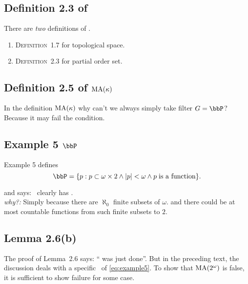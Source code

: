 \subsection{Definition 2.3 of \ccc}

There are \emph{two} definitions of \ccc.
\begin{enumerate}
\item \textsc{Definition}~1.7 for topological space.
\item \textsc{Definition}~2.3 for partial order  set.
\end{enumerate}

\subsection{Definition 2.5 of \(\mathop{\rm MA}\nolimits(\kappa)\)}

In the definition \(\mathop{\rm MA}\nolimits(\kappa)\)
why can't we always simply take filter \(G=\bbP\)?\\
Because it may fail the  condition.

\subsection{Example 5 \(\bbP\)}

Example 5 defines
\begin{equation} \label{eq:example5}
\bbP = \{p: p \subset \omega\times 2 \land |p|<\omega 
  \land p \;\textnormal{is a function}\}.
\end{equation}

and says: \bbP\ clearly has \ccc. \\
\emph{why?:} Simply because there are \(\aleph_0\) finite subsets of \(\omega\).
and there could be at most countable functions from 
such finite subsets to $2$.

\subsection{Lemma 2.6(b)}

The proof of Lemma~2.6 says: `` was just done''.
But in the preceding text, the discussion deals with 
a specific \bbP\ of \eqref{eq:example5}.
To show that \(\mathop{\rm MA}\nolimits(2^\omega)\) is false, it is sufficient
to show failure for some case.

